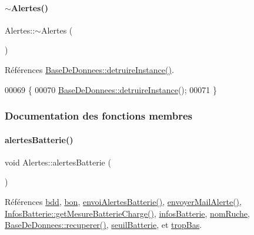 \paragraph{\texorpdfstring{$\sim$\+Alertes()}{~Alertes()}}
{\footnotesize\ttfamily Alertes\+::$\sim$\+Alertes (\begin{DoxyParamCaption}{ }\end{DoxyParamCaption})}



Références \hyperlink{class_base_de_donnees_a457401c0816b888c77ce915997545f4e}{Base\+De\+Donnees\+::detruire\+Instance()}.


\begin{DoxyCode}
00069 \{
00070     \hyperlink{class_base_de_donnees_a457401c0816b888c77ce915997545f4e}{BaseDeDonnees::detruireInstance}();
00071 \}
\end{DoxyCode}


\subsubsection{Documentation des fonctions membres}
\mbox{\label{class_alertes_ad708a4b800d56c1439b65d12a3c6b027}} 
\paragraph{\texorpdfstring{alertes\+Batterie()}{alertesBatterie()}}
{\footnotesize\ttfamily void Alertes\+::alertes\+Batterie (\begin{DoxyParamCaption}{ }\end{DoxyParamCaption})}



Références \hyperlink{class_alertes_a91e58b69d29922e8e984efb767ae5268}{bdd}, \hyperlink{parametres_8h_aaa6de8207c94675264c90b10b613368da5ac8ec3b54d90a07c6bb5a77ef971821}{bon}, \hyperlink{class_alertes_a0e81d795f8e7559eab19fcb9be138f5f}{envoi\+Alertes\+Batterie()}, \hyperlink{class_alertes_a375783502a78109f3323dc1ed90cfdc9}{envoyer\+Mail\+Alerte()}, \hyperlink{class_infos_batterie_a8c37174d0d36e4f5ada9d16dd5894803}{Infos\+Batterie\+::get\+Mesure\+Batterie\+Charge()}, \hyperlink{class_alertes_ad5c756a52ff4d6ae85cc0f03bd80582b}{infos\+Batterie}, \hyperlink{class_alertes_a212f2a7185bcc7b11f3e54200272bdcf}{nom\+Ruche}, \hyperlink{class_base_de_donnees_a77539baad389f5acf754cd2cd452403e}{Base\+De\+Donnees\+::recuperer()}, \hyperlink{class_alertes_a3ac4e5d2b1a8fdd9cf4633861948110f}{seuil\+Batterie}, et \hyperlink{parametres_8h_aaa6de8207c94675264c90b10b613368da4257e2f8921856770c8266f55c937295}{trop\+Bas}.



